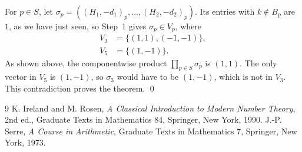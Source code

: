 \documentclass[11pt]{article}
\begin{document}
For $p\in S$, let $\sigma_p=((H_1,-d_1)_p,\dots,(H_{2},-d_{2})_p)$. Its entries with $k\notin B_p$ are $1$, as we have just seen, so Step~1 gives $\sigma_p\in V_p$, where
\begin{align*}
V_{3}&=\{(1,1),(-1,-1)\},\\
V_{5}&=\{(1,-1)\}.
\end{align*}
As shown above, the componentwise product $\prod_{p\in S}\sigma_p$ is $(1,1)$. The only vector in $V_{5}$ is $(1,-1)$, so $\sigma_{3}$ would have to be $(1,-1)$, which is not in $V_{3}$. This contradiction proves the theorem.
\qed

\begin{thebibliography}{9}
 K. Ireland and M. Rosen, \emph{A Classical Introduction to Modern Number Theory}, 2nd ed., Graduate Texts in Mathematics 84, Springer, New York, 1990.
 J.-P. Serre, \emph{A Course in Arithmetic}, Graduate Texts in Mathematics 7, Springer, New York, 1973.
\end{thebibliography}
\end{document}
